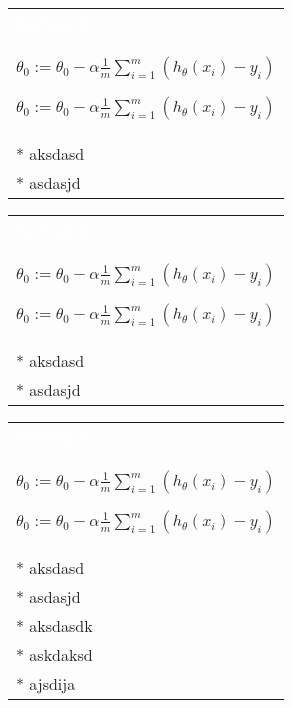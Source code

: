 \documentclass[a4paper,12pt,ngerman,fleqn]{article}
\newcommand{\mybox}[3]{
        \centering
        \begin{tabularx}{0.9\textwidth}{|X|}
            \rowcolor{accent}
            \rule{0pt}{20pt}
            \textcolor{white}{\textbf{#1}} \\
            \def\temp{#2}\ifx\temp\empty
                
            \else
                #2 \\ \hline
            \fi
            #3
            \\ \hline
        \end{tabularx}
    }
\begin{document}
    \begin{minipage}[t]{.51\textwidth}
        \vspace{1pt}
        \mybox
            {Section 4}
            {\( \theta_0 := \theta_0 - \alpha \frac{1}{m} \sum\limits_{i=1}^{m}(h_\theta(x_{i}) - y_{i}) \)}
            {
                * aksdasd \\
                * asdasjd
            }
        \newline
        \newline
        \newline
        \mybox
            {Section 5}
            {\( \theta_0 := \theta_0 - \alpha \frac{1}{m} \sum\limits_{i=1}^{m}(h_\theta(x_{i}) - y_{i}) \)}
            {
                * aksdasd \\
                * asdasjd
            }
        \newline
        \newline
        \newline
        \mybox
            {Section 6}
            {\( \theta_0 := \theta_0 - \alpha \frac{1}{m} \sum\limits_{i=1}^{m}(h_\theta(x_{i}) - y_{i}) \)}
            {
                * aksdasd \\
                * asdasjd \\
                * aksdasdk \\
                * askdaksd \\
                * ajsdija
            }
        \newline
    \end{minipage}

    \vspace{258.5pt}
    
\end{document}
